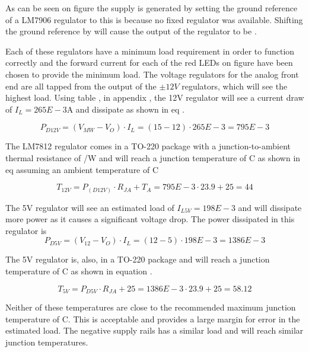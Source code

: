 As can be seen on figure  the  supply is generated by setting the ground reference of a LM7906  regulator to  this is because no fixed  regulator was available. Shifting the ground reference by  will cause the output of the  regulator to be .

Each of these regulators have a minimum load requirement in order to function correctly and the forward current for each of the red LEDs on figure  have been chosen to provide the minimum load. The voltage regulators for the analog front end are all tapped from the output of the $\pm 12V$ regulators, which will see the highest load. Using table , in appendix , the 12V regulator will see a current draw of $I_L = 265E-3$A and dissipate  as shown in eq .

\begin{equation}\label{eq:7_1_6_PD12}
    P_{D12V} = (V_{MW} - V_O) \cdot I_L = (15 - 12)\cdot 265E-3 = 795E-3
\end{equation}

The LM7812 regulator comes in a TO-220 package with a junction-to-ambient thermal resistance of /W and will reach a junction temperature of C as shown in eq  assuming an ambient temperature of C

\begin{equation}\label{eq:7_1_6_T12V}
    T_{12V} = P_(D12V) \cdot R_{JA} + T_A = 795E-3 \cdot 23.9 + 25 = 44
\end{equation}

The 5V regulator will see an estimated load of $I_{L5V} = 198E-3$ and will dissipate more power as it causes a significant voltage drop. The power dissipated in this regulator is 
\begin{equation}\label{eq:7_1_6_PD5V}
    P_{D5V} = (V_{12} - V_O) \cdot I_L = (12 - 5)\cdot 198E-3 = 1386E-3
\end{equation}

The 5V regulator is, also, in a TO-220 package and will reach a junction temperature of C as shown in equation .

\begin{equation}\label{eq:7_1_6_T5V}
    T_{5V} = P_{D5V} \cdot  R_{JA} + 25 = 1386E-3 \cdot 23.9 + 25  = 58.12
\end{equation}

Neither of these temperatures are close to the recommended maximum junction temperature of C. This is acceptable and provides a large margin for error in the estimated load. The negative supply rails has a similar load and will reach similar junction temperatures.


